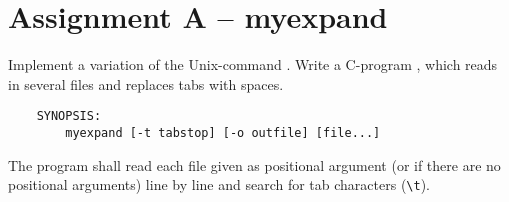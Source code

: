 




\section*{Assignment A -- myexpand}

Implement a variation of the Unix-command .
Write a C-program ,
which reads in several files and replaces tabs with spaces.

\begin{verbatim}
    SYNOPSIS:
        myexpand [-t tabstop] [-o outfile] [file...]
\end{verbatim}






The program shall read each file given as positional argument
(or  if there are no positional arguments)
line by line and search for tab characters (\verb|\t|).

